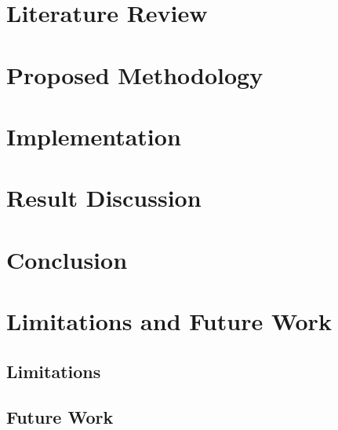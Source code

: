 \documentclass[12pt]{dalthesis}
\begin{document}
\chapter{Literature Review}\label{ch:lit}


\chapter{Proposed Methodology}\label{ch:method}


\chapter{Implementation}\label{ch:impl}


\chapter{Result Discussion}\label{ch:results}


\chapter{Conclusion}\label{ch:conclusion}


\chapter{Limitations and Future Work}

\section{Limitations}


\section{Future Work}




\end{document}
